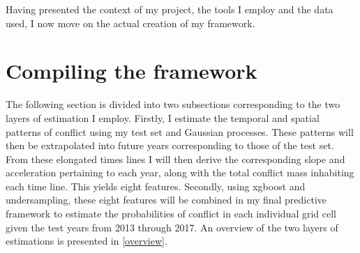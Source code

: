 \documentclass[a4paper]{article}
\begin{document}

Having presented the context of my project, the tools I employ and the data used, I now move on the actual creation of my framework.\par


\section{Compiling the framework}%

The following section is divided into two subsections corresponding to the two layers of estimation I employ. Firstly, I estimate the temporal and spatial patterns of conflict using my test set and Gaussian processes. These patterns will then be extrapolated into future years corresponding to those of the test set. From these elongated times lines I will then derive the corresponding slope and acceleration pertaining to each year, along with the total conflict mass inhabiting each time line. This yields eight features. Secondly, using xgboost and undersampling, these eight features will be combined in my final predictive framework to estimate the probabilities of conflict in each individual grid cell given the test years from 2013 through 2017. An overview of the two layers of estimations is presented in \autoref{overview}.\par
\end{document}
